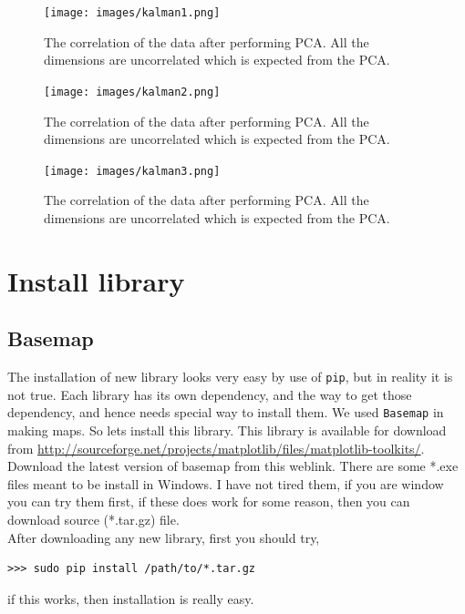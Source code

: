 \documentclass[10pt]{book}
\begin{document}
\beforefig
\begin{figure}[h!]
  \centering
    \texttt{[image: images/kalman1.png]}
  \caption{The correlation of the data after performing PCA. All the dimensions are uncorrelated which is expected from the PCA.}
   \label{fig:pca_2}
\end{figure}
\afterfig

\beforefig
\begin{figure}[h!]
  \centering
    \texttt{[image: images/kalman2.png]}
  \caption{The correlation of the data after performing PCA. All the dimensions are uncorrelated which is expected from the PCA.}
   \label{fig:pca_2}
\end{figure}
\afterfig

\beforefig
\begin{figure}[h!]
  \centering
    \texttt{[image: images/kalman3.png]}
  \caption{The correlation of the data after performing PCA. All the dimensions are uncorrelated which is expected from the PCA.}
   \label{fig:pca_2}
\end{figure}
\afterfig

\appendix

\chapter{Install library}
\section{Basemap}
The installation of new library looks very easy by use of \verb"pip", but in reality it is not true. Each library has its own dependency, and the way to get those dependency, and hence needs special way to install them. We used \verb"Basemap" in making maps. So lets install this library. This library is available for download from \url{http://sourceforge.net/projects/matplotlib/files/matplotlib-toolkits/}. Download the latest version of basemap from this weblink. There are some *.exe files meant to be install in Windows. I have not tired them, if you are window you can try them first, if these does work for some reason, then you can download source (*.tar.gz) file. \\

After downloading any new library, first you should try,
\beforeverb \begin{verbatim}
>>> sudo pip install /path/to/*.tar.gz
\end{verbatim} \afterverb
if this works, then installation is really easy. \\
\end{document}
